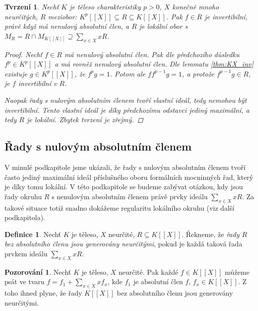 \documentclass[11pt,a4paper]{article}
\newcounter{numb}
\theoremstyle{definition}
\newtheorem*{definice}{Definice}
\newtheorem{pozorovani}[numb]{Pozorování}
\theoremstyle{plain}
\newtheorem{tvrzeni}[numb]{Tvrzení}
\begin{document}
\begin{tvrzeni} \label{thm:R_loc}
	Nechť $K$ je těleso charakteristiky $p > 0$, $X$ konečně mnoho neurčitých, $R$ meziobor: $K^p[[X]] \subseteq R \subseteq K[[X]]$. Pak $f \in R$ je invertibilní, právě když má nenulový absolutní člen, a $R$ je lokální obor s $M_R = R \cap M_{K[[X]]} \supseteq \sum_{x \in X} x R$.

	\begin{proof}
		Nechť $f \in R$ má nenulový absolutní člen. Pak dle předchozího důsledku $f^p \in K^p[[X]]$ a má rovněž nenulový absolutní člen. Dle lemmatu \ref{thm:KX_inv} existuje $g \in K^p[[X]]$, že $f^p g = 1$. Potom ale $f f^{p - 1} g = 1$, a protože $f^{p - 1} g \in R$, je $f$ invertibilní v $R$.

		Naopak řady s nulovým absolutním členem tvoří vlastní ideál, tedy nemohou být invertibilní. Tento vlastní ideál je díky předchozímu odstavci jediný maximální, a tedy $R$ je lokální. Zbytek tvrzení je zřejmý.
	\end{proof}
\end{tvrzeni}


\subsection{Řady s nulovým absolutním členem}

V minulé podkapitole jsme ukázali, že řady s nulovým absolutním členem tvoří často jediný maximální ideál příslušného oboru formálních mocninných řad, který je díky tomu lokální. V této podkapitole se budeme zabývat otázkou, kdy jsou řady okruhu $R$ s nenulovým absolutním členem právě prvky ideálu $\sum_{x \in X} xR$. Za takové situace totiž snadno dokážeme regularitu lokálního okruhu (viz další podkapitola).

\newcommand*{\absOK}[1]{řady $#1$ bez absolutního členu jsou generovány neurčitými}
\begin{definice}
	Nechť $K$ je těleso, $X$ neurčité, $R \subseteq K[[X]]$. Řekneme, že \emph{\absOK{R}}, pokud je každá taková řada prvkem ideálu $\sum_{x \in X} xR$.
\end{definice}

\begin{pozorovani}
	Nechť $K$ je těleso, $X$ neurčité. Pak každé $f \in K[[X]]$ můžeme psát ve tvaru $f = f_1 + \sum_{x \in X} x f_x$, kde $f_1$ je absolutní člen $f$, $f_x \in K[[X]]$. Z toho ihned plyne, že \absOK{K[[X]]}.
\end{pozorovani}
\end{document}
